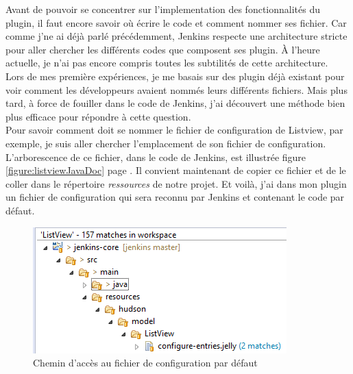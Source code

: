Avant de pouvoir se concentrer sur l'implementation des fonctionnalités du plugin, il faut encore savoir où écrire le code et comment nommer ses fichier. Car comme j'ne ai déjà parlé précédemment, Jenkins respecte une architecture stricte pour aller chercher les différents codes que composent ses plugin. \`{A} l'heure actuelle, je n'ai pas encore compris toutes les subtilités de cette architecture.\\
Lors de mes première expériences, je me basais sur des plugin déjà existant pour voir comment les développeurs avaient nommés leurs différents fichiers. Mais plus tard, à force de fouiller dans le code de Jenkins, j'ai découvert une méthode bien plus efficace pour répondre à cette question.\\
Pour savoir comment doit se nommer le fichier de configuration de Listview, par exemple, je suis aller chercher l'emplacement de son fichier de configuration. L'arborescence de ce fichier, dans le code de Jenkins, est illustrée figure \ref{figure:listviewJavaDoc} page \pageref{figure:listviewJavaDoc}. Il convient maintenant de copier ce fichier et de le coller dans le répertoire \emph{ressources} de notre projet. Et voilà, j'ai dans mon plugin un fichier de configuration qui sera reconnu par Jenkins et contenant le code par défaut.\\


\begin{figure}[!h]
  \centering
      \includegraphics{images/listviewSearch.png}
  \caption{Chemin d'accès au fichier de configuration par défaut}
	\label{figure:listviewSearch}
\end{figure}



%
%


